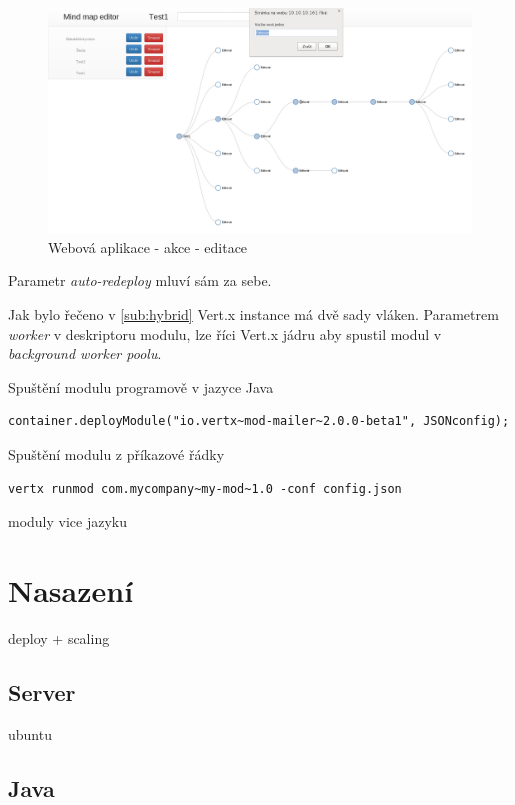 \begin{figure}
\begin{centering}
\includegraphics[width	=1\textwidth]{obrazky/mindmap3}
\par\end{centering}
\caption{Webová aplikace - akce - editace\label{fig:midnmap3}}
\end{figure}

Parametr \emph{auto-redeploy} mluví sám za sebe.

Jak bylo řečeno v \ref{sub:hybrid} Vert.x instance má dvě sady vláken. Parametrem \emph{worker} v deskriptoru modulu, lze říci Vert.x jádru aby spustil modul v \emph{background worker poolu}. 

Spuštění modulu programově v jazyce Java
\begin{lstlisting}
container.deployModule("io.vertx~mod-mailer~2.0.0-beta1", JSONconfig);
\end{lstlisting}

Spuštění modulu z příkazové řádky
\begin{lstlisting}
vertx runmod com.mycompany~my-mod~1.0 -conf config.json
\end{lstlisting}

moduly vice jazyku

\section{Nasazení}

deploy + scaling

\subsection{Server}

ubuntu

\subsection{Java}

